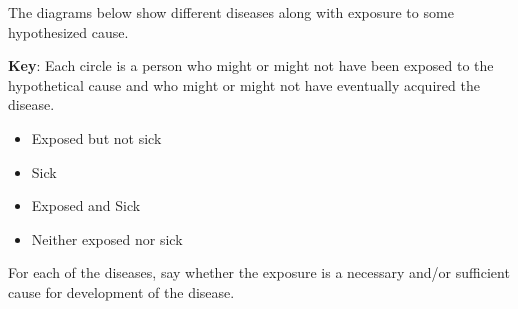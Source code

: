 
The diagrams below show different diseases along with exposure to
some hypothesized cause.  

{\bf Key}: Each circle is a person who might or might not have been exposed to the hypothetical cause and who might or might not have eventually acquired the disease.
\begin{itemize}
\item Exposed but not sick 
\item Sick 
\item Exposed and Sick 
\item Neither exposed nor sick 
\end{itemize}


For each of the diseases, say whether the
exposure is a necessary and/or sufficient cause for development of the disease.

